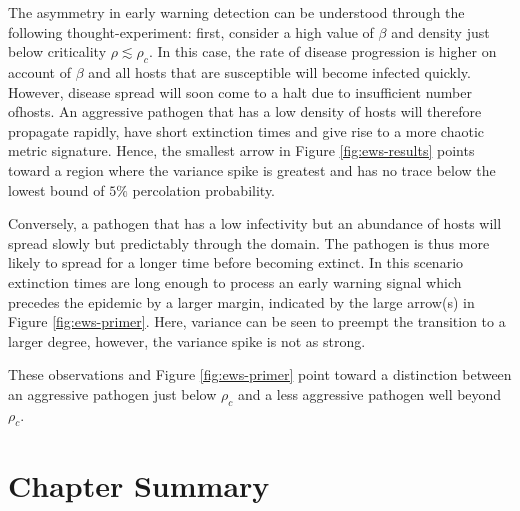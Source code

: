 The asymmetry in early warning detection can be understood through the following thought-experiment: %
first, consider a high value of $\beta$ and density just below criticality $\rho\lesssim\rho_c$. %
In this case, the rate of disease progression is higher on account of $\beta$ and all hosts %
that are susceptible will become infected quickly. %
However, disease spread will soon come to a halt due to insufficient number ofhosts. %
An aggressive pathogen that has a low density of hosts will therefore propagate rapidly, %
have short extinction times and give rise to a more chaotic metric signature. %
Hence, the smallest arrow in Figure \ref{fig:ews-results} points toward a region where the %
variance spike is greatest and has no trace below the lowest bound of $5\%$ percolation probability. %

Conversely, a pathogen that has a low infectivity but an abundance of hosts will spread %
slowly but predictably through the domain. The pathogen is thus more likely to spread for a longer time before becoming extinct. In this scenario extinction times are long enough to process an early warning signal which precedes the epidemic by a larger margin, indicated by the large arrow(s) in Figure \ref{fig:ews-primer}. Here, variance can be seen to preempt the transition to a larger degree, however, the variance spike is not as strong.
 
These observations and Figure \ref{fig:ews-primer} point toward a distinction between an %
aggressive pathogen just below $\rho_c$ and a less aggressive pathogen well beyond $\rho_c$. %
 
 
\section{Chapter Summary}

